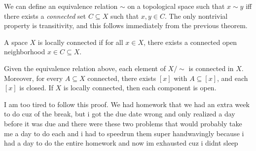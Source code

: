 
We can define an equivalence relation $\sim $ on a topological space such that $x\sim y$ iff there exists a \emph{connected} set $C\subseteq X$ such that $x,y\in C$. The only nontrivial property is transitivity, and this follows immediately from the previous theorem.

\begin{definition}\label{dfn:4.2}
	A space $X$ is locally connected if for all $x\in X$, there exists a connected open neighborhood $x\in C\subseteq X$.
\end{definition}

\begin{theorem}\label{thm:4.4}
	Given the equivalence relation above, each element of $X/\sim $ is connected in $X$. Moreover, for every $A\subseteq X$ connected, there exists $[x]$ with $A\subseteq [x]$, and each $[x]$ is closed. If $X$ is locally connected, then each component is open.
\end{theorem}

I am too tired to follow this proof. We had homework that we had an extra week to do cuz of the break, but i got the due date wrong and only realized a day before it was due and there were these two problems that would probably take me a day to do each and i had to speedrun them super handwavingly because i had a day to do the entire homework and now im exhausted cuz i didnt sleep
